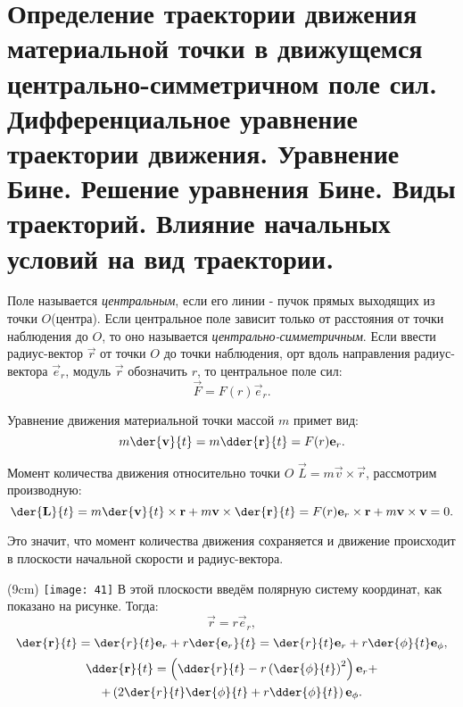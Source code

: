 \chapter{Определение траектории движения материальной точки в движущемся
центрально-симметричном поле сил. Дифференциальное уравнение траектории
движения. Уравнение Бине. Решение уравнения Бине. Виды траекторий. Влияние
начальных условий на вид траектории.}


Поле называется \textit{центральным}, если его линии - пучок прямых выходящих
из точки \( O \)(центра). Если центральное поле зависит только от расстояния от
точки наблюдения до \( O \), то оно называется \textit{центрально-симметричным}.
Если ввести радиус-вектор \( \vec{r} \) от точки \( O \) до точки наблюдения,
орт вдоль направления радиус-вектора \( \vec{e}_r \), модуль \( \vec{r} \)
обозначить \( r \), то центральное поле сил:
\[
    \vec{F} = F(r)\vec{e}_{r}.
\]

Уравнение движения материальной точки массой \( m \) примет вид: 
\[
    m\der{\vec{v}}{t} = m\dder{\vec{r}}{t} = F(r)\vec{e}_{r}.
\]
    
Момент количества движения относительно точки \( O \)
\( \vec{L} = m \vec{v} \times \vec{r} \), рассмотрим производную:
\[
    \der{\vec{L}}{t} = 
    m \der{\vec{v}}{t} \times \vec{r} + m \vec{v} \times \der{\vec{r}}{t} =
    F(r)\vec{e}_{r} \times \vec{r} + m \vec{v} \times \vec{v} = 0.
\]
    
Это значит, что момент количества движения сохраняется и движение происходит в
плоскости начальной скорости и радиус-вектора.

\sidefig(9cm)
{\texttt{[image: 41]}}{
В этой плоскости введём полярную систему координат, как показано на рисунке.
Тогда:
\[
    \vec{r} = r \vec{e}_{r},
\]
\[
    \der{\vec{r}}{t} = 
    \der{r}{t} \vec{e}_{r} + 
    r \der{\vec{e}_{r}}{t} =
    \der{r}{t} \vec{e}_{r} + 
    r \der{\phi}{t}\vec{e}_{\phi},
\]
\begin{gather*}
    \dder{\vec{r}}{t} = 
    \left(
        \dder{r}{t} - 
        r
        \left(
        \der{\phi}{t}
        \right)^2
    \right)\vec{e}_{r} + \\ +
    \left( 
        2\der{r}{t} \der{\phi}{t}+ 
        r \dder{\phi}{t}
    \right)\vec{e}_{\phi}.
\end{gather*}
}

